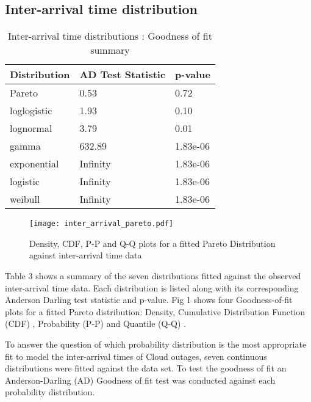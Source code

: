 \documentclass[5p]{elsarticle}
\begin{document}
\subsection{Inter-arrival time distribution}

\begin {table}
\caption {Inter-arrival time distributions :  Goodness of fit summary} 
\begin{center}
\begin{tabular}{p{2.1cm} |  p{3.1cm} | p{1.3cm}} \hline \bf{Distribution} & \bf{AD Test Statistic} & \bf{p-value}
\\ \hline Pareto & 0.53 & 0.72 
\\ loglogistic & 1.93 & 0.10
\\ lognormal & 3.79 & 0.01
\\ gamma & 632.89 & 1.83e-06	
\\ exponential & Infinity  & 1.83e-06
\\ logistic & Infinity & 1.83e-06	
\\ weibull  & Infinity & 1.83e-06 
\\ \hline
\end{tabular}
\end{center}
\end{table}

\begin{figure*}[]
\begin{center}
\texttt{[image: inter\_arrival\_pareto.pdf]} 
\caption{Density, CDF, P-P and Q-Q plots for a fitted Pareto Distribution against inter-arrival time data}
\end{center}
\label{fig:outagedistribution}
\end{figure*}

Table 3 shows a summary of the seven distributions fitted against the observed inter-arrival time data. Each distribution is listed along with its corresponding Anderson Darling test statistic and p-value. Fig 1 shows four Goodness-of-fit plots for a fitted Pareto distribution: Density, Cumulative Distribution Function (CDF) , Probability (P-P) \cite{gibbons2011nonparametric}  and Quantile (Q-Q) \cite{wilk1968probability}.  


To answer the question of which probability distribution is the most appropriate fit to model the inter-arrival times of Cloud outages, seven continuous distributions were fitted against the data set. To test the goodness of fit an Anderson-Darling (AD) Goodness of fit test was conducted against each probability distribution. 
\end{document}
